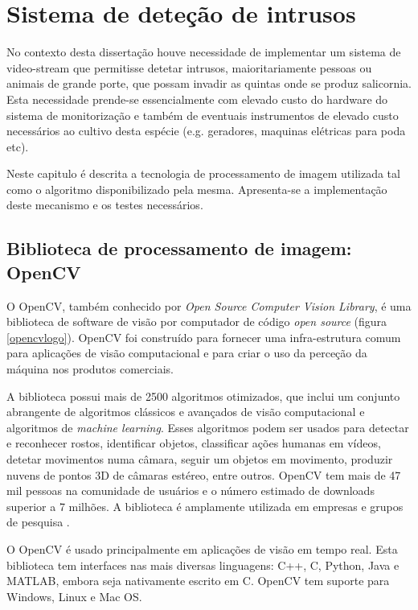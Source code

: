 \section{Sistema de deteção de intrusos}


No contexto desta dissertação houve necessidade de implementar um sistema de video-stream que permitisse detetar intrusos, maioritariamente pessoas ou animais de grande porte, que possam invadir as quintas onde se produz salicornia. Esta necessidade prende-se essencialmente com elevado custo do hardware do sistema de monitorização e também de eventuais instrumentos de elevado custo necessários ao cultivo desta espécie (e.g. geradores, maquinas elétricas para poda etc).

Neste capitulo é descrita a tecnologia de processamento de imagem utilizada tal como o algoritmo disponibilizado pela mesma. Apresenta-se a implementação deste mecanismo e os testes necessários. 


\subsection{Biblioteca de processamento de imagem: OpenCV}

O OpenCV, também conhecido por \textit{Open Source Computer Vision Library}, é uma biblioteca de software de visão por computador de código \textit{open source} (figura \ref{opencvlogo}). OpenCV foi construído para fornecer uma infra-estrutura comum para aplicações de visão computacional e para criar o uso da perceção da máquina nos produtos comerciais.

A biblioteca possui mais de 2500 algoritmos otimizados, que inclui um conjunto abrangente de algoritmos clássicos e avançados de visão computacional e algoritmos de \textit{machine learning}. Esses algoritmos podem ser usados para detectar e reconhecer rostos, identificar objetos, classificar ações humanas em vídeos, detetar movimentos numa câmara, seguir um objetos em movimento, produzir nuvens de pontos 3D de câmaras estéreo, entre outros.
OpenCV tem mais de 47 mil pessoas na comunidade de usuários e o número estimado de downloads superior a 7 milhões. A biblioteca é amplamente utilizada em empresas e grupos de pesquisa \cite{Itseez}.

O OpenCV é usado principalmente em aplicações de visão em tempo real. Esta biblioteca tem interfaces nas mais diversas linguagens: C++, C, Python, Java e MATLAB, embora seja nativamente escrito em C. OpenCV tem suporte para Windows, Linux e Mac OS\cite{Itseez}. 

